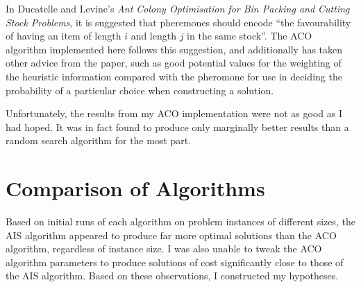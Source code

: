 \documentclass{article}
\begin{document}
    \bigskip

    In Ducatelle and Levine's \textit{Ant Colony Optimisation for Bin Packing and Cutting Stock Problems}\cite{acoforcsp}, it is suggested that pheremones should encode \enquote{the favourability of having an item of length \(i\) and length \(j\) in the same \textelp{} stock}. The ACO algorithm implemented here follows this suggestion, and additionally has taken other advice from the paper, such as good potential values for the weighting of the heuristic information compared with the pheromone for use in deciding the probability of a particular choice when constructing a solution.

    \bigskip

    Unfortunately, the results from my ACO implementation were not as good as I had hoped. It was in fact found to produce only marginally better results than a random search algorithm for the most part.

\section{Comparison of Algorithms}

  Based on initial runs of each algorithm on problem instances of different sizes, the AIS algorithm appeared to produce far more optimal solutions than the ACO algorithm, regardless of instance size. I was also unable to tweak the ACO algorithm parameters to produce solutions of cost significantly close to those of the AIS algorithm. Based on these observations, I constructed my hypotheses.
\end{document}

